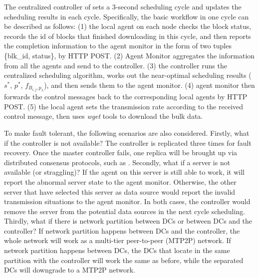 The centralized controller of \name sets a 3-second scheduling cycle and updates the scheduling results in each cycle. Specifically, the basic workflow in one cycle can be described as follows: (1) the local agent on each node checks the block status, records the id of blocks that finished downloading in this cycle, and then reports the completion information to the agent monitor in the form of two tuples \{blk\_id, status\}, by HTTP POST. (2) Agent Monitor aggregates the information from all the agents and send to the controller. (3) the controller runs the centralized scheduling algorithm, works out the near-optimal scheduling results ($s^*$, $p^*$, $f_{B_{i,j},p_\lambda}$), and then sends them to the agent monitor. (4) agent monitor then forwards the control messages back to the corresponding local agents by HTTP POST. (5) the local agent sets the transmission rate according to the received control message, then uses \emph{wget} tools to download the bulk data.

To make \name fault tolerant, the following scenarios are also considered. Firstly, what if the controller is not available? The controller is replicated three times for fault recovery. Once the master controller fails, one replica will be brought up via distributed consensus protocols, such as \cite{lamport1998part}. Secondly, what if a server is not available (or straggling)? If the agent on this server is still able to work, it will report the abnormal server state to the agent monitor. Otherwise, the other server that have selected this server as data source would report the invalid transmission situations to the agent monitor. In both cases, the controller would remove the server from the potential data sources in the next cycle scheduling. Thirdly, what if there is network partition between DCs or between DCs and the controller? If network partition happens between DCs and the controller, the whole network will work as a multi-tier peer-to-peer (MTP2P) network. If network partition happens between DCs, the DCs that locate in the same partition with the controller will work the same as before, while the separated DCs will downgrade to a MTP2P network.

